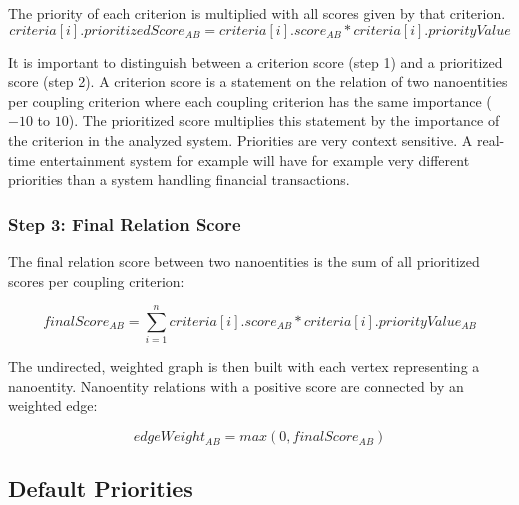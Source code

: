 The priority of each criterion is multiplied with all scores given by that criterion. 
\begin{displaymath}
	criteria[i].prioritizedScore_{AB} = criteria[i].score_{AB} * criteria[i].priorityValue
\end{displaymath}

It is important to distinguish between a criterion score (step 1) and a prioritized score (step 2). A criterion score is a statement on the relation of two nanoentities per coupling criterion where each coupling criterion has the same importance ($-10$ to $10$). The prioritized score multiplies this statement by the importance of the criterion in the analyzed system. Priorities are very context sensitive. A real-time entertainment system for example will have for example very different priorities than a system handling financial transactions. 

\subsubsection{Step 3: Final Relation Score}

The final relation score between two nanoentities is the sum of all prioritized scores per coupling criterion: 

\begin{displaymath}
finalScore_{AB} = \sum\limits_{i=1}^n criteria[i].score_{AB} * criteria[i].priorityValue_{AB}
\end{displaymath}

The undirected, weighted graph is then built with each vertex representing a nanoentity. Nanoentity relations with a positive score are connected by an weighted edge:

\begin{displaymath}
edgeWeight_{AB} = max(0, finalScore_{AB})	
\end{displaymath}

	
\subsection{Default Priorities}
\label{sec:defaultPriorities}

